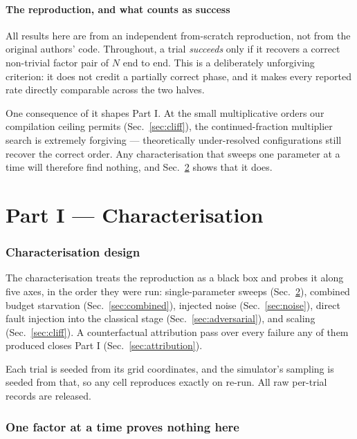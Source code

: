 \documentclass[preprint,11pt]{elsarticle}
\begin{document}
\subsection{The reproduction, and what counts as success}

All results here are from an independent from-scratch reproduction, not from
the original authors' code. Throughout, a trial \emph{succeeds} only if it
recovers a correct non-trivial factor pair of $N$ end to end. This is a
deliberately unforgiving criterion: it does not credit a partially correct
phase, and it makes every reported rate directly comparable across the two
halves.

One consequence of it shapes Part I. At the small multiplicative orders our
compilation ceiling permits (Sec.~\ref{sec:cliff}), the continued-fraction
multiplier search is extremely forgiving --- theoretically under-resolved
configurations still recover the correct order. Any characterisation that
sweeps one parameter at a time will therefore find nothing, and
Sec.~\ref{sec:ofat} shows that it does.

\part*{Part I --- Characterisation}

\section{Characterisation design}
\label{sec:chardesign}

The characterisation treats the reproduction as a black box and probes it
along five axes, in the order they were run: single-parameter sweeps
(Sec.~\ref{sec:ofat}), combined budget starvation
(Sec.~\ref{sec:combined}), injected noise (Sec.~\ref{sec:noise}), direct
fault injection into the classical stage (Sec.~\ref{sec:adversarial}), and
scaling (Sec.~\ref{sec:cliff}). A counterfactual attribution pass over every
failure any of them produced closes Part I (Sec.~\ref{sec:attribution}).

Each trial is seeded from its grid coordinates, and the simulator's sampling
is seeded from that, so any cell reproduces exactly on re-run. All raw
per-trial records are released.

\section{One factor at a time proves nothing here}
\label{sec:ofat}
\end{document}
